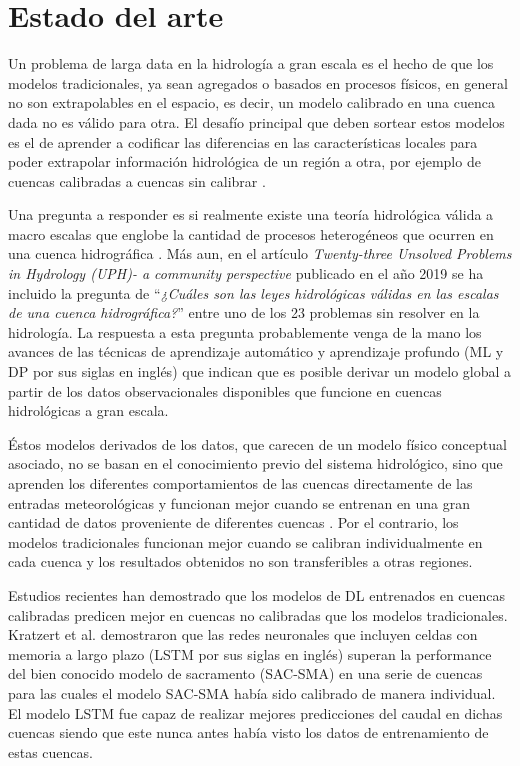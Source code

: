 \section{Estado del arte}

Un problema de larga data en la hidrología a gran escala es el hecho de que los modelos tradicionales, ya sean agregados o basados 
en procesos físicos, en general no son extrapolables en el espacio, es decir, un modelo calibrado en una cuenca dada no es 
válido para otra. El desafío principal que deben sortear estos modelos es el de aprender a codificar las diferencias 
en las características locales para poder extrapolar información hidrológica 
de un región a otra, por ejemplo de cuencas calibradas a cuencas sin calibrar 
\cite{Bloschl2} \cite{Razavi} \cite{Hrachowitz} \cite{Bloschl3}.   

Una pregunta a responder es si realmente existe una teoría hidrológica válida a macro escalas que englobe la cantidad de 
procesos heterogéneos que ocurren en una cuenca hidrográfica \cite{nearing}. Más aun, en el artículo \textit{Twenty-three Unsolved Problems 
in Hydrology (UPH)- a community perspective} 
publicado en el año 2019 \cite{Bloschl} se ha incluido la pregunta de 
``\textit{¿Cuáles son las leyes hidrológicas válidas en las  escalas de una cuenca hidrográfica?}''
entre uno de los 23 problemas sin resolver en la hidrología. La respuesta a esta pregunta probablemente venga de la mano
los avances de las técnicas de aprendizaje automático y aprendizaje profundo (ML y DP por sus siglas en inglés) que 
indican que es posible derivar un modelo global a partir de los datos
observacionales disponibles que funcione en cuencas hidrológicas a gran escala\cite{nearing}. 


Éstos modelos derivados de los datos, que carecen de un modelo físico conceptual asociado, no se basan en el conocimiento 
previo del sistema hidrológico, sino que aprenden los diferentes comportamientos de las cuencas directamente de 
las entradas meteorológicas y funcionan mejor cuando se entrenan en una gran cantidad de datos proveniente de diferentes cuencas 
\cite{Gupta}\cite{Peters}. 
Por el contrario, los modelos tradicionales funcionan mejor cuando se calibran individualmente en cada cuenca y los resultados 
obtenidos no son transferibles a otras regiones.  

Estudios recientes han demostrado que los modelos
de DL entrenados en cuencas calibradas predicen mejor en cuencas no calibradas que los modelos tradicionales.
Kratzert et al. \cite{Kratzert2} demostraron que las redes neuronales que incluyen celdas con memoria a largo plazo 
(LSTM por sus siglas en inglés) superan la performance del bien conocido modelo de sacramento (SAC-SMA) \cite{sac1} \cite{sac2}
en una serie de cuencas para las cuales el modelo SAC-SMA había sido calibrado de manera individual.  
El modelo LSTM fue capaz de realizar mejores predicciones del caudal en dichas cuencas siendo que este nunca antes había visto
los datos de entrenamiento de estas cuencas. 

